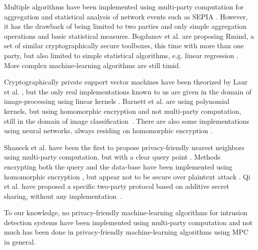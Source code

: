 Multiple algorithms have been implemented using multi-party computation for aggregation and statistical analysis of network events such as SEPIA \cite{Burkhart2010SEPIA:Statistics}. However, it has the drawback of being limited to two parties and only simple aggregation operations and basic statistical measures. Bogdanov et al. are proposing Rmind, a set of similar cryptographically secure toolboxes, this time with more than one party, but also limited to simple statistical algorithms, e.g. linear regression \cite{Bogdanov2018Rmind:Analysis}. More complex machine-learning algorithms are still timid. 

Cryptographically private support vector machines have been theorized by Laur et al. \cite{Laur2006CryptographicallyMachines}, but the only real implementations known to us are given in the domain of image-processing using linear kernels \cite{Makri2017PICS:SVM}. Barnett et al. are using polynomial kernels, but using homomorphic encryption and not multi-party computation, still in the domain of image classification~\cite{Barnett2017ImageData}. There are also some implementations using neural networks, always residing on homomorphic encryption \cite{Dowlin2016CryptoNets:Research}. 

Shaneck et al. have been the first to propose privacy-friendly nearest neighbors using multi-party computation, but with a clear query point \cite{Shaneck2009PrivacySearch}. Methods encrypting both the query and the data-base have been implemented using homomorphic encryption \cite{Wong2009SecureDatabases,Hu2011ProcessingHomomorphism}, but appear not to be secure over plaintext attack \cite{Yao2013SecureRevisited}. Qi et al. have proposed a specific two-party protocol based on additive secret sharing, without any implementation~\cite{QiEfficient}.

To our knowledge, no privacy-friendly machine-learning algorithms for intrusion detection systems have been implemented using multi-party computation and not much has been done in privacy-friendly machine-learning algorithms using MPC in general.

